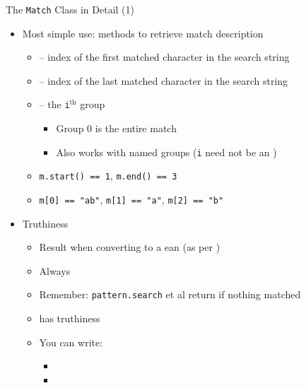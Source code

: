 \begin{frame}{The \texttt{Match} Class in Detail (1)}
%
\begin{itemize}
\item Most simple use: methods to retrieve match description
	\begin{itemize}
	\item {} -- index of the first matched character in the search string
	\item {} -- index of the last matched character in the search string
	\item {} -- the \texttt{i}$^{\text{th}}$ group
		\begin{itemize}
		\item Group 0 is the entire match
		\item Also works with named groups (\texttt{i} need not be an )
		\end{itemize}
	\item[\Thus]  \thus \texttt{m.start() == 1}, \texttt{m.end() == 3}
	\item[\Thus]  \thus \texttt{m[0] == "ab"}, \texttt{m[1] == "a"}, \texttt{m[2] == "b"}
	\end{itemize}
\pause
\item Truthiness
	\begin{itemize}
	\item Result when converting to a ean (as per )
	\item Always 
	\item Remember: \texttt{pattern.search} et al return  if nothing matched
	\item {} has truthiness 
	\item[\Thus] You can write:
		\begin{itemize}
		\item {}
		\item {}
		\end{itemize}
	\end{itemize}
\end{itemize}
%
\end{frame}


